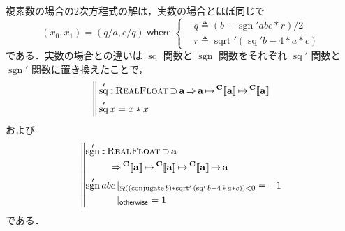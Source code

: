 \documentclass[a5paper,twoside,fleqn,draft]{jsbook}
\def\[{[\![}
\def\]{]\!]}
\DeclareMathOperator{\sgn}{sgn}
\newcommand{\mBrace}{\Vert}
\newcommand{\mKeyword}[1]{\mathsf{#1}}
\newcommand{\mOtherwiseKeyword}{\mKeyword{otherwise}}
\newcommand{\mWhereKeyword}{\mKeyword{where}}
\DeclareMathOperator{\mOtherwise}{\mOtherwiseKeyword}
\DeclareMathOperator{\mSuperClass}{\Rightarrow}
\DeclareMathOperator{\mSuperSet}{\supset}
\DeclareMathOperator{\mWhere}{\mWhereKeyword}
\newcommand{\mSpecialFunc}[1]{#1}
\DeclareMathOperator{\mConjugate}{\mSpecialFunc{conjugate}}
\DeclareMathOperator{\mRealPart}{\Re}
\DeclareMathOperator{\mSq}{\mSpecialFunc{sq}}
\DeclareMathOperator{\mSqrt}{\mSpecialFunc{sqrt}}
\DeclareMathOperator{\mComplexTimes}{\Dot\ast}
\DeclareMathOperator{\mIn}{{:\!:}}
\DeclareMathOperator{\mLetEq}{\triangleq}
\DeclareMathOperator{\mMapsTo}{\mapsto}
\newcommand{\mType}[1]{\mathbf{#1}} %
\newcommand{\mA}{\mType{a}}
\newcommand{\mTypeAssemble}[2]{{}^\mType{#1}\[\mType{#2}\]}
\newcommand{\mComplexType}[1]{\mTypeAssemble{C}{#1}}
\newcommand{\mTypeClass}[1]{\textsc{#1}} %
\newcommand{\mRealFloatTypeClass}{\mTypeClass{RealFloat}}
\newcommand{\mGuard}[1]{\mathop{\mid_{#1}}}
\begin{document}
複素数の場合の2次方程式の解は，実数の場合とほぼ同じで
\begin{equation}
  (x_0,x_1)=(q/a,c/q)\mWhere\left\{
  \begin{aligned}
    &q\mLetEq\left(b+\sgn'abc*r\right)/2\\
    &r\mLetEq\mSqrt'{(\mSq'b-4*a*c)}
  \end{aligned}
  \right.
\end{equation}
である．実数の場合との違いは $\mSq$ 関数と $\sgn$ 関数をそれぞれ
$\mSq'$ 関数と $\sgn'$ 関数に置き換えたことで，
\begin{equation}
  \left\mBrace
  \begin{aligned}
    &\mSq'
    \mIn\mRealFloatTypeClass\mSuperSet\mA
    \mSuperClass\mA
    \mMapsTo\mComplexType{a}
    \mMapsTo\mComplexType{a}\\
    &\mSq'x
    =x*x
  \end{aligned}
  \right.
\end{equation}
および
\begin{equation}
  \left\mBrace
  \begin{aligned}
    &\begin{aligned}
       \sgn'
       &\mIn\mRealFloatTypeClass\mSuperSet\mA\\
       &\quad\mSuperClass\mComplexType{a}
       \mMapsTo\mComplexType{a}
       \mMapsTo\mComplexType{a}
       \mMapsTo\mA
     \end{aligned}\\
    &\begin{aligned}
       \sgn'abc
       &\mGuard{\mRealPart((\mConjugate b)*\mSqrt'{(\mSq' b-4\mComplexTimes a*c)})<0}
       =-1\\
       &\mGuard{\mOtherwise}
       =1
     \end{aligned}
  \end{aligned}
  \right.
\end{equation}
である．
\end{document}
